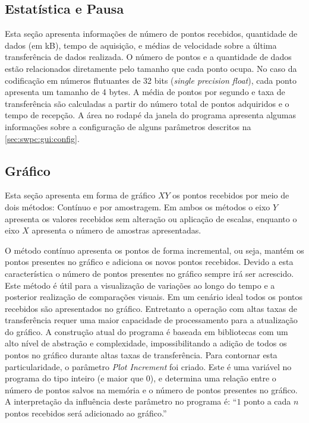 		\subsection{Estatística e Pausa}\label{sec:swpc:gui:stats}

			Esta seção apresenta informações de número de pontos recebidos, quantidade de dados (em kB), tempo de aquisição, e médias de velocidade sobre a última transferência de dados realizada. O número de pontos e a quantidade de dados estão relacionados diretamente pelo tamanho que cada ponto ocupa. No caso da codificação em números flutuantes de 32 bits (\textit{single precision float}), cada ponto apresenta um tamanho de 4 bytes. A média de pontos por segundo e taxa de transferência são calculadas a partir do número total de pontos adquiridos e o tempo de recepção. A área no rodapé da janela do programa apresenta algumas informações sobre a configuração de alguns parâmetros descritos na \ref{sec:swpc:gui:config}.


		\subsection{Gráfico}\label{sec:swpc:gui:graph}

			Esta seção apresenta em forma de gráfico $XY$ os pontos recebidos por meio de dois métodos: Contínuo e por amostragem. Em ambos os métodos o eixo $Y$ apresenta os valores recebidos sem alteração ou aplicação de escalas, enquanto o eixo $X$ apresenta o número de amostras apresentadas.
			%

			O método contínuo apresenta os pontos de forma incremental, ou seja, mantém os pontos presentes no gráfico e adiciona os novos pontos recebidos. Devido a esta característica o número de pontos presentes no gráfico sempre irá ser acrescido. Este método é útil para a visualização de variações ao longo do tempo e a posterior realização de comparações visuais. Em um cenário ideal todos os pontos recebidos são apresentados no gráfico. Entretanto a operação com altas taxas de transferência requer uma maior capacidade de processamento para a atualização do gráfico. A construção atual do programa é baseada em bibliotecas com um alto nível de abstração e complexidade, impossibilitando a adição de todos os pontos no gráfico durante altas taxas de transferência. Para contornar esta particularidade, o parâmetro \textit{Plot Increment} foi criado. Este é uma variável no programa do tipo inteiro (e maior que 0), e determina uma relação entre o número de pontos salvos na memória e o número de pontos presentes no gráfico. A interpretação da influência deste parâmetro no programa é: ``$1$ ponto a cada $n$ pontos recebidos será adicionado ao gráfico.''

